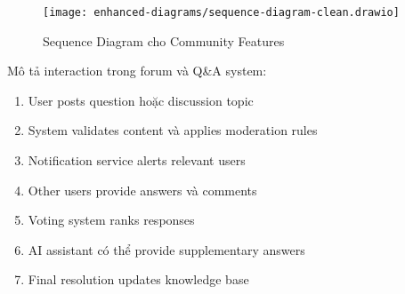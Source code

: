 \begin{figure}[H]
\centering
\texttt{[image: enhanced-diagrams/sequence-diagram-clean.drawio]}
\caption{Sequence Diagram cho Community Features}
\label{fig:sequence-community}
\end{figure}

Mô tả interaction trong forum và Q\&A system:

\begin{enumerate}
    \item User posts question hoặc discussion topic
    \item System validates content và applies moderation rules
    \item Notification service alerts relevant users
    \item Other users provide answers và comments
    \item Voting system ranks responses
    \item AI assistant có thể provide supplementary answers
    \item Final resolution updates knowledge base
\end{enumerate}
